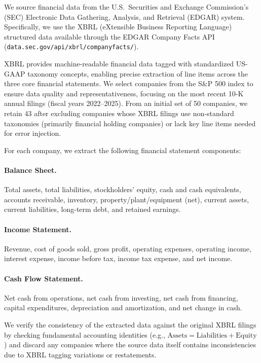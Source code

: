 \documentclass[11pt]{article}
\begin{document}
We source financial data from the U.S.\ Securities and Exchange Commission's (SEC) Electronic Data Gathering, Analysis, and Retrieval (EDGAR) system.
Specifically, we use the XBRL (eXtensible Business Reporting Language) structured data available through the EDGAR Company Facts API (\texttt{data.sec.gov/api/xbrl/companyfacts/}).

XBRL provides machine-readable financial data tagged with standardized US-GAAP taxonomy concepts, enabling precise extraction of line items across the three core financial statements.
We select companies from the S\&P 500 index to ensure data quality and representativeness, focusing on the most recent 10-K annual filings (fiscal years 2022--2025).
From an initial set of 50 companies, we retain 43 after excluding companies whose XBRL filings use non-standard taxonomies (primarily financial holding companies) or lack key line items needed for error injection.

For each company, we extract the following financial statement components:

\paragraph{Balance Sheet.}
Total assets, total liabilities, stockholders' equity, cash and cash equivalents, accounts receivable, inventory, property/plant/equipment (net), current assets, current liabilities, long-term debt, and retained earnings.

\paragraph{Income Statement.}
Revenue, cost of goods sold, gross profit, operating expenses, operating income, interest expense, income before tax, income tax expense, and net income.

\paragraph{Cash Flow Statement.}
Net cash from operations, net cash from investing, net cash from financing, capital expenditures, depreciation and amortization, and net change in cash.

We verify the consistency of the extracted data against the original XBRL filings by checking fundamental accounting identities (e.g., $\text{Assets} = \text{Liabilities} + \text{Equity}$) and discard any companies where the source data itself contains inconsistencies due to XBRL tagging variations or restatements.
\end{document}
